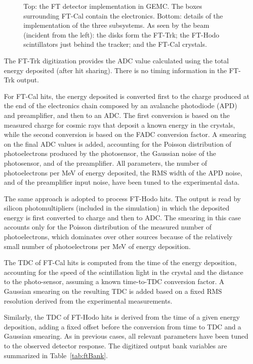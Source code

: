 \begin{figure}
	\caption{Top: the FT detector implementation in GEMC. The boxes surrounding FT-Cal contain the electronics.
          Bottom: details of the implementation of the three subsystems. As seen by the beam (incident from the left):
          the disks form the FT-Trk; the FT-Hodo scintillators just behind the tracker; and the FT-Cal crystals.}
	\label{fig:ftGeometry}
\end{figure}

The FT-Trk digitization provides the ADC value calculated using the total energy deposited (after hit sharing).
There is no timing information in the FT-Trk output.

For FT-Cal hits, the energy deposited is converted first to the charge produced at the end of the electronics chain
composed by an avalanche photodiode (APD) and preamplifier, and then to an ADC. The first conversion is based on the
measured charge for cosmic rays that deposit a known energy in the crystals, while the second conversion is based on the
FADC conversion factor. A smearing on the final ADC values is added, accounting for the Poisson distribution of
photoelectrons produced by the photosensor, the Gaussian noise of the photosensor, and of the preamplifier. All
parameters, the number of photoelectrons per MeV of energy deposited, the RMS width of the APD noise, and of the
preamplifier input noise, have been tuned to the experimental data.

The same approach is adopted to process FT-Hodo hits. The output is read by silicon photomultipliers (included in the
simulation) in which the deposited energy is first converted to charge and then to ADC. The smearing in this case accounts
only for the Poisson distribution of the measured number of photoelectrons, which dominates over other sources because
of the relatively small number of photoelectrons per MeV of energy deposition.

The TDC of FT-Cal hits is computed from the time of the energy deposition, accounting for the speed of the scintillation
light in the crystal and the distance to the photo-sensor, assuming a known time-to-TDC conversion factor. A Gaussian
smearing on the resulting TDC is added based on a fixed RMS resolution derived from the experimental measurements.

Similarly, the TDC of FT-Hodo hits is derived from the time of a given energy deposition, adding a fixed offset before
the conversion from time to TDC and a Gaussian smearing. As in previous cases, all relevant parameters have been tuned
to the observed detector response. The digitized output bank variables are summarized in Table~\ref{tab:ftBank}.

